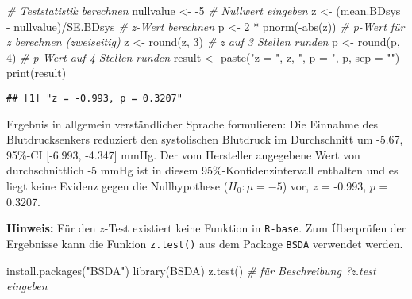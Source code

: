 \documentclass[
]{book}
\newenvironment{Shaded}{\begin{snugshade}}{\end{snugshade}}
\newcommand{\AttributeTok}[1]{\textcolor[rgb]{0.77,0.63,0.00}{#1}}
\newcommand{\CommentTok}[1]{\textcolor[rgb]{0.56,0.35,0.01}{\textit{#1}}}
\newcommand{\DecValTok}[1]{\textcolor[rgb]{0.00,0.00,0.81}{#1}}
\newcommand{\FunctionTok}[1]{\textcolor[rgb]{0.00,0.00,0.00}{#1}}
\newcommand{\NormalTok}[1]{#1}
\newcommand{\OtherTok}[1]{\textcolor[rgb]{0.56,0.35,0.01}{#1}}
\newcommand{\SpecialCharTok}[1]{\textcolor[rgb]{0.00,0.00,0.00}{#1}}
\newcommand{\StringTok}[1]{\textcolor[rgb]{0.31,0.60,0.02}{#1}}
\begin{document}
\begin{Shaded}
\begin{Highlighting}[]
\CommentTok{\# Teststatistik berechnen}
\NormalTok{nullvalue }\OtherTok{\textless{}{-}} \SpecialCharTok{{-}}\DecValTok{5}                        \CommentTok{\# Nullwert eingeben}
\NormalTok{z }\OtherTok{\textless{}{-}}\NormalTok{ (mean.BDsys }\SpecialCharTok{{-}}\NormalTok{ nullvalue)}\SpecialCharTok{/}\NormalTok{SE.BDsys }\CommentTok{\# z{-}Wert berechnen}
\NormalTok{p }\OtherTok{\textless{}{-}} \DecValTok{2} \SpecialCharTok{*} \FunctionTok{pnorm}\NormalTok{(}\SpecialCharTok{{-}}\FunctionTok{abs}\NormalTok{(z))                }\CommentTok{\# p{-}Wert für z berechnen  (zweiseitig) }
\NormalTok{z }\OtherTok{\textless{}{-}} \FunctionTok{round}\NormalTok{(z, }\DecValTok{3}\NormalTok{)                       }\CommentTok{\# z auf 3 Stellen runden}
\NormalTok{p }\OtherTok{\textless{}{-}} \FunctionTok{round}\NormalTok{(p, }\DecValTok{4}\NormalTok{)                       }\CommentTok{\# p{-}Wert auf 4 Stellen runden}
\NormalTok{result }\OtherTok{\textless{}{-}} \FunctionTok{paste}\NormalTok{(}\StringTok{"z = "}\NormalTok{, z, }\StringTok{", p = "}\NormalTok{, p, }\AttributeTok{sep =} \StringTok{""}\NormalTok{)  }
\FunctionTok{print}\NormalTok{(result)}
\end{Highlighting}
\end{Shaded}

\begin{verbatim}
## [1] "z = -0.993, p = 0.3207"
\end{verbatim}

Ergebnis in allgemein verständlicher Sprache formulieren: Die Einnahme des Blutdrucksenkers reduziert den systolischen Blutdruck im Durchschnitt um -5.67, 95\%-CI {[}-6.993, -4.347{]} mmHg. Der vom Hersteller angegebene Wert von durchschnittlich -5 mmHg ist in diesem 95\%-Konfidenzintervall enthalten und es liegt keine Evidenz gegen die Nullhypothese (\(H_0: \mu = -5\)) vor, \(z\) = -0.993, \(p\) = 0.3207.

\textbf{Hinweis:} Für den \(z\)-Test existiert keine Funktion in \texttt{R-base}. Zum Überprüfen der
Ergebnisse kann die Funkion \texttt{z.test()} aus dem Package \texttt{BSDA} verwendet werden.

\begin{Shaded}
\begin{Highlighting}[]
\FunctionTok{install.packages}\NormalTok{(}\StringTok{"BSDA"}\NormalTok{)}
\FunctionTok{library}\NormalTok{(BSDA)}
\FunctionTok{z.test}\NormalTok{()                               }\CommentTok{\# für Beschreibung ?z.test eingeben}
\end{Highlighting}
\end{Shaded}
\end{document}
